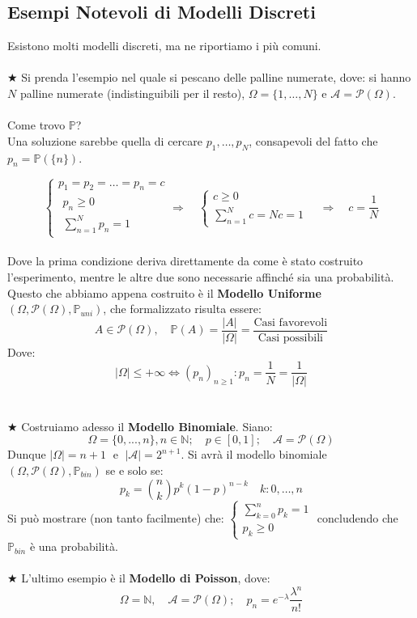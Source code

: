 \subsection{Esempi Notevoli di Modelli Discreti}
Esistono molti modelli discreti, ma ne riportiamo i più comuni.\\
\\
\(\bigstar\) Si prenda l'esempio nel quale si pescano delle palline numerate, dove: si hanno $N$ palline numerate (indistinguibili per il resto), $\Omega = \{1, \dots, N\}$ e $\mathcal{A} = \mathcal{P}(\Omega)$. \\
\\
Come trovo $\mathbb{P}$?\\
Una soluzione sarebbe quella di cercare $p_1, \dots, p_N$, consapevoli del fatto che \(p_n = \mathbb{P}(\{n\})\).

\[
\begin{cases}
    p_1 = p_2 = \dots = p_n = c\\
    \begin{array}{l}
        p_n \ge 0\\[3pt]
        \sum_{n=1}^N p_n = 1
    \end{array}
\end{cases}
\Rightarrow \quad 
\begin{cases}
    c\geq0\\
    \sum_{n=1}^N c = Nc = 1
\end{cases}
\quad \Rightarrow \quad c = \frac{1}{N}
\]\\
Dove la prima condizione deriva direttamente da come è stato costruito l'esperimento, mentre le altre due sono necessarie affinché sia una probabilità. Questo che abbiamo appena costruito è il \textbf{Modello Uniforme} $(\Omega, \mathcal{P}(\Omega), \mathbb{P}_{uni})$, che formalizzato risulta essere:
\[A\in\mathcal{P}(\Omega),\quad \mathbb{P}(A) = \frac{|A|}{|\Omega|} = \frac{\text{Casi favorevoli}}{\text{Casi possibili}}\]
Dove: 
\[|\Omega| \le +\infty \iff (p_n)_{n\geq1}: \boxed{p_n = \frac{1}{N} = \frac{1}{|\Omega|}}\]\\
\\
\(\bigstar\) Costruiamo adesso il \textbf{Modello Binomiale}. Siano:
\[\Omega = \{0, ..., n\}, n\in \mathbb{N};\quad p\in[0, 1];\quad \mathcal{A} = \mathcal{P}(\Omega)\]
Dunque $|\Omega| = n+1\;$ e $\;|\mathcal{A}| = 2^{n+1} $. Si avrà il modello binomiale $(\Omega, \mathcal{P}(\Omega), \mathbb{P}_{bin})$ se e solo se:
\[\boxed{p_k = \binom{n}{k} p^k(1-p)^{n-k}}\quad k:0, \dots, n\]
Si può mostrare (non tanto facilmente) che: 
\(\begin{cases}
    \sum_{k=0}^np_k = 1\\
    p_k \geq 0
\end{cases}\) concludendo che $\mathbb{P}_{bin}$ è una probabilità.\\
\\
\(\bigstar\) L'ultimo esempio è il \textbf{Modello di Poisson}, dove:
\[\Omega = \mathbb{N}, \quad \mathcal{A} = \mathcal{P}(\Omega); \quad \boxed{p_n = e^{-\lambda}\frac{\lambda^n}{n!}}\]
